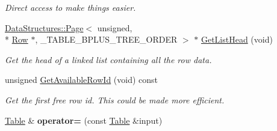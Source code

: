 \begin{DoxyCompactItemize}
\begin{DoxyCompactList}\small\item\em Direct access to make things easier. \end{DoxyCompactList}\item 
\hypertarget{class_data_structures_1_1_table_aa3680c65795f9b6f5fafde5bacd95d06}{\hyperlink{struct_data_structures_1_1_page}{Data\-Structures\-::\-Page}$<$ unsigned, \\*
\hyperlink{struct_data_structures_1_1_table_1_1_row}{Row} $\ast$, \-\_\-\-T\-A\-B\-L\-E\-\_\-\-B\-P\-L\-U\-S\-\_\-\-T\-R\-E\-E\-\_\-\-O\-R\-D\-E\-R $>$ $\ast$ \hyperlink{class_data_structures_1_1_table_aa3680c65795f9b6f5fafde5bacd95d06}{Get\-List\-Head} (void)}\label{class_data_structures_1_1_table_aa3680c65795f9b6f5fafde5bacd95d06}

\begin{DoxyCompactList}\small\item\em Get the head of a linked list containing all the row data. \end{DoxyCompactList}\item 
\hypertarget{class_data_structures_1_1_table_ad39be87bf219159db7110878c97d36f3}{unsigned \hyperlink{class_data_structures_1_1_table_ad39be87bf219159db7110878c97d36f3}{Get\-Available\-Row\-Id} (void) const }\label{class_data_structures_1_1_table_ad39be87bf219159db7110878c97d36f3}

\begin{DoxyCompactList}\small\item\em Get the first free row id. This could be made more efficient. \end{DoxyCompactList}\item 
\hypertarget{class_data_structures_1_1_table_af71ef172c80534cfa9f125b6872c39b7}{\hyperlink{class_data_structures_1_1_table}{Table} \& {\bfseries operator=} (const \hyperlink{class_data_structures_1_1_table}{Table} \&input)}\label{class_data_structures_1_1_table_af71ef172c80534cfa9f125b6872c39b7}

\end{DoxyCompactItemize}
